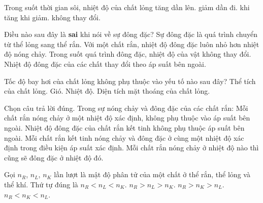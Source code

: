 \begin{ex}
Trong suốt thời gian sôi, nhiệt độ của chất lỏng
\choice
{tăng dần lên.}
{giảm dần đi.}
{khi tăng khi giảm.}
{\True không thay đổi.}
\end{ex}


\begin{ex}
Điều nào sau đây là \textbf{sai} khi nói về sự đông đặc?
\choice
{Sự đông đặc là quá trình chuyển từ thể lỏng sang thể rắn.}
{\True Với một chất rắn, nhiệt độ đông đặc luôn nhỏ hơn nhiệt độ nóng chảy.}
{Trong suốt quá trình đông đặc, nhiệt độ của vật không thay đổi.}
{Nhiệt độ đông đặc của các chất thay đổi theo áp suất bên ngoài.}
\end{ex}


\begin{ex}
Tốc độ bay hơi của chất lỏng không phụ thuộc vào yếu tố nào sau đây?
\choice
{\True Thể tích của chất lỏng.}
{Gió.}
{Nhiệt độ.}
{Diện tích mặt thoáng của chất lỏng.}
\end{ex}


\begin{ex}
Chọn câu trả lời đúng. Trong sự nóng chảy và đông đặc của các chất rắn:
\choice
{Mỗi chất rắn nóng chảy ở một nhiệt độ xác định, không phụ thuộc vào áp suất bên ngoài.}
{Nhiệt độ đông đặc của chất rắn kết tinh không phụ thuộc áp suất bên ngoài.}
{\True Mỗi chất rắn kết tinh nóng chảy và đông đặc ở cùng một nhiệt độ xác định trong điều kiện áp suất xác định.}
{Mỗi chất rắn nóng chảy ở nhiệt độ nào thì cũng sẽ đông đặc ở nhiệt độ đó.}
\end{ex}


\begin{ex}
Gọi $n_R$, $n_L$, $n_K$ lần lượt là mật độ phân tử của một chất ở thể rắn, thể lỏng và thể khí. Thứ tự đúng là
\choice
{$n_R<n_L<n_K$.}
{\True $n_R>n_L>n_K$.}
{$n_R>n_K>n_L$.}
{$n_R<n_K<n_L$.}
\end{ex}


